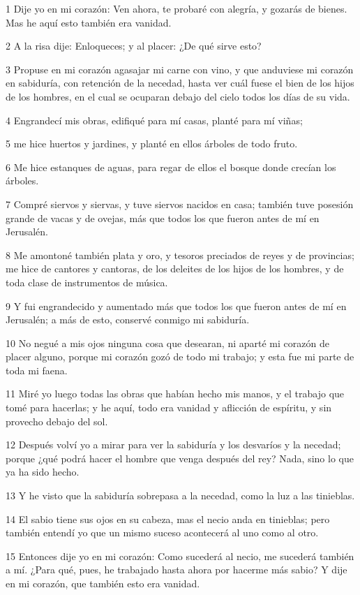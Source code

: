 \par 1 Dije yo en mi corazón: Ven ahora, te probaré con alegría, y gozarás de bienes. Mas he aquí esto también era vanidad.
\par 2 A la risa dije: Enloqueces; y al placer: ¿De qué sirve esto?
\par 3 Propuse en mi corazón agasajar mi carne con vino, y que anduviese mi corazón en sabiduría, con retención de la necedad, hasta ver cuál fuese el bien de los hijos de los hombres, en el cual se ocuparan debajo del cielo todos los días de su vida.
\par 4 Engrandecí mis obras, edifiqué para mí casas, planté para mí viñas;
\par 5 me hice huertos y jardines, y planté en ellos árboles de todo fruto.
\par 6 Me hice estanques de aguas, para regar de ellos el bosque donde crecían los árboles.
\par 7 Compré siervos y siervas, y tuve siervos nacidos en casa; también tuve posesión grande de vacas y de ovejas, más que todos los que fueron antes de mí en Jerusalén.
\par 8 Me amontoné también plata y oro, y tesoros preciados de reyes y de provincias; me hice de cantores y cantoras, de los deleites de los hijos de los hombres, y de toda clase de instrumentos de música. 
\par 9 Y fui engrandecido y aumentado más que todos los que fueron antes de mí en Jerusalén; a más de esto, conservé conmigo mi sabiduría.
\par 10 No negué a mis ojos ninguna cosa que desearan, ni aparté mi corazón de placer alguno, porque mi corazón gozó de todo mi trabajo; y esta fue mi parte de toda mi faena.
\par 11 Miré yo luego todas las obras que habían hecho mis manos, y el trabajo que tomé para hacerlas; y he aquí, todo era vanidad y aflicción de espíritu, y sin provecho debajo del sol.
\par 12 Después volví yo a mirar para ver la sabiduría y los desvaríos y la necedad; porque ¿qué podrá hacer el hombre que venga después del rey? Nada, sino lo que ya ha sido hecho.
\par 13 Y he visto que la sabiduría sobrepasa a la necedad, como la luz a las tinieblas.
\par 14 El sabio tiene sus ojos en su cabeza, mas el necio anda en tinieblas; pero también entendí yo que un mismo suceso acontecerá al uno como al otro.
\par 15 Entonces dije yo en mi corazón: Como sucederá al necio, me sucederá también a mí. ¿Para qué, pues, he trabajado hasta ahora por hacerme más sabio? Y dije en mi corazón, que también esto era vanidad.
